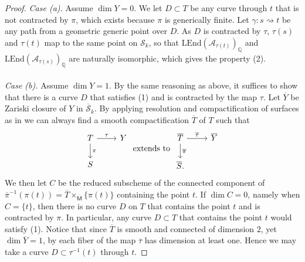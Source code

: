 \documentclass[11pt, letterpaper]{amsart}
\theoremstyle{plain}
\theoremstyle{definition}
\newcommand{\IQ}{\mathbb{Q}}
\newcommand{\<}{\langle}
\renewcommand{\>}{\rangle}
\newcommand{\shS}{\mathscr{S}}
\newcommand{\sfM}{\mathsf{M}}
\newcommand{\sA}{\mathcal{A}}
\newcommand{\LEnd}{\mathrm{LEnd}}
\begin{document}
\begin{proof}
     \noindent \textit{Case (a).} Assume $\dim Y=0$.
     	We let $D\subset T$ be any curve through $t$ that is not contracted by $\pi$, which exists because $\pi$ is generically finite.
     	Let $\gamma : s \rightsquigarrow t$ be any path from a geometric generic point over $D$.
     	As $D$ is contracted by $\tau$, $\tau(s)$ and $\tau(t)$ map to the same point on $\shS_k$, so that $\LEnd(\sA_{\tau(t)})_\IQ$ and $\LEnd(\sA_{\tau(s)})_\IQ$ are naturally isomorphic, which gives the property (2).\\\\
     \noindent \textit{Case (b).} Assume $\dim Y=1$.
     	By the same reasoning as above, it suffices to show that there is a curve $D$ that satisfies (1) and is contracted by the map $\tau$.
     	Let $\overline{Y}$ be Zariski closure of $Y$ in $\overline{\shS}_k$. 
     	By applying resolution and compactification of surfaces as in \cite[\href{https://stacks.math.columbia.edu/tag/0C5H}{Tag 0C5H}]{stacks-project} we can always find a smooth compactification $\overline{T}$ of $T$ such that 
     	\begin{equation}
     		\label{eqn: extend to Tbar}
     		\begin{tikzcd}
     			T & Y \\
     			{S}
     			\arrow["\tau", from=1-1, to=1-2]
     			\arrow["\pi", from=1-1, to=2-1]
     		\end{tikzcd} \textrm{ extends to } \begin{tikzcd}
     			{\overline{T}} & {\overline{Y}} \\
     			{\overline{S}.}
     			\arrow["\overline{\tau}", from=1-1, to=1-2]
     			\arrow["\overline{\pi}", from=1-1, to=2-1]
     		\end{tikzcd}
     	\end{equation}
     We then let $C$ be the reduced subscheme of the connected component of $\overline{\pi}^{-1}(\pi(t))=\overline{T}\times_{\overline{\sfM}} \{\pi(t)\}$ containing the point $t$. 
     If $\dim C = 0$, namely when $C = \{t\}$, then there is no curve $D$ on $T$ that contains the point $t$ and is contracted by $\pi$.
     In particular, any curve $D\subset T$ that contains the point $t$ would satisfy (1).
     Notice that since $\overline{T}$ is smooth and connected of dimension $2$, yet $\dim \overline{Y}=1$, by \cite[\href{https://stacks.math.columbia.edu/tag/02FZ}{Tag 02FZ}]{stacks-project} each fiber of the map $\overline{\tau}$ has dimension at least one.
     Hence we may take a curve $D\subset \tau^{-1}(t)$ through $t$.
     

\end{proof}
\end{document}
